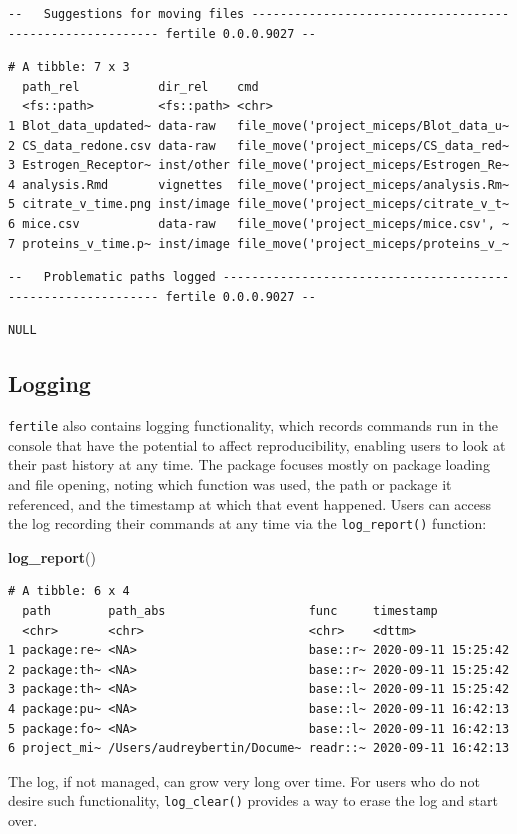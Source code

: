 \documentclass[12pt,twoside]{reedthesis}
\newenvironment{Shaded}{\begin{snugshade}}{\end{snugshade}}
\newcommand{\KeywordTok}[1]{\textcolor[rgb]{0.13,0.29,0.53}{\textbf{#1}}}
\newcommand{\NormalTok}[1]{#1}
\begin{document}
\begin{verbatim}
--   Suggestions for moving files --------------------------------------------------------- fertile 0.0.0.9027 --
\end{verbatim}
\begin{verbatim}
# A tibble: 7 x 3
  path_rel           dir_rel    cmd                                   
  <fs::path>         <fs::path> <chr>                                 
1 Blot_data_updated~ data-raw   file_move('project_miceps/Blot_data_u~
2 CS_data_redone.csv data-raw   file_move('project_miceps/CS_data_red~
3 Estrogen_Receptor~ inst/other file_move('project_miceps/Estrogen_Re~
4 analysis.Rmd       vignettes  file_move('project_miceps/analysis.Rm~
5 citrate_v_time.png inst/image file_move('project_miceps/citrate_v_t~
6 mice.csv           data-raw   file_move('project_miceps/mice.csv', ~
7 proteins_v_time.p~ inst/image file_move('project_miceps/proteins_v_~
\end{verbatim}
\begin{verbatim}
--   Problematic paths logged ------------------------------------------------------------- fertile 0.0.0.9027 --
\end{verbatim}
\begin{verbatim}
NULL
\end{verbatim}
\subsection{Logging}\label{logging}

\texttt{fertile} also contains logging functionality, which records
commands run in the console that have the potential to affect
reproducibility, enabling users to look at their past history at any
time. The package focuses mostly on package loading and file opening,
noting which function was used, the path or package it referenced, and
the timestamp at which that event happened. Users can access the log
recording their commands at any time via the \texttt{log\_report()}
function:
\begin{Shaded}
\begin{Highlighting}[]
\KeywordTok{log_report}\NormalTok{()}
\end{Highlighting}
\end{Shaded}
\begin{verbatim}
# A tibble: 6 x 4
  path        path_abs                    func     timestamp          
  <chr>       <chr>                       <chr>    <dttm>             
1 package:re~ <NA>                        base::r~ 2020-09-11 15:25:42
2 package:th~ <NA>                        base::r~ 2020-09-11 15:25:42
3 package:th~ <NA>                        base::l~ 2020-09-11 15:25:42
4 package:pu~ <NA>                        base::l~ 2020-09-11 16:42:13
5 package:fo~ <NA>                        base::l~ 2020-09-11 16:42:13
6 project_mi~ /Users/audreybertin/Docume~ readr::~ 2020-09-11 16:42:13
\end{verbatim}
The log, if not managed, can grow very long over time. For users who do
not desire such functionality, \texttt{log\_clear()} provides a way to
erase the log and start over.
\end{document}
